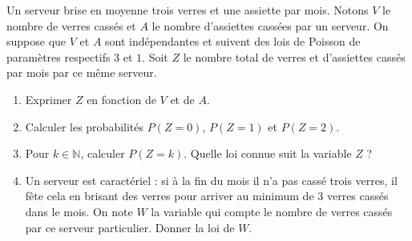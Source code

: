 \documentclass[12pt,reqno]{amsart}
\begin{document}
\begin{exo}

  Un serveur brise en moyenne trois verres et une assiette par mois. Notons $V$ le nombre de verres cassés et $A$ le nombre d'assiettes cassées par un serveur. On suppose que $V$ et $A$ sont indépendantes et suivent des lois de Poisson de paramètres respectifs $3$ et $1$. Soit $Z$ le nombre total de verres et d'assiettes cassés par mois par ce même serveur.
  \begin{enumerate}
    \item Exprimer $Z$ en fonction de $V$ et de $A$.
    \item Calculer les probabilités $P(Z=0)$, $P(Z=1)$ et $P(Z=2)$.
    \item Pour $k \in \mathbb{N}$, calculer $P(Z=k)$. Quelle loi connue suit la variable $Z$ ?
    \item Un serveur est caractériel : si à la fin du mois il n'a pas cassé trois verres, il fête cela en brisant des verres pour arriver au minimum de $3$ verres cassés dans le mois. On note $W$ la variable qui compte le nombre de verres cassés par ce serveur particulier. Donner la loi de $W$.
  \end{enumerate}

\end{exo}
\end{document}

